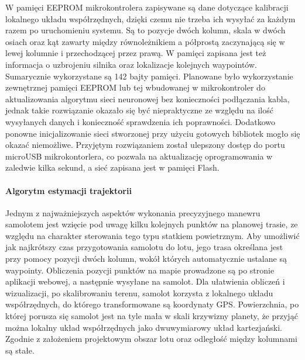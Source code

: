 \documentclass[12pt, a4paper]{article}
\begin{document}
W pamięci EEPROM mikrokontrolera zapisywane są dane dotyczące kalibracji lokalnego  układu współrzędnych, dzięki czemu nie trzeba ich wysyłać za każdym razem po uruchomieniu systemu. Są to pozycje dwóch kolumn, skala w dwóch osiach oraz kąt zawarty między równoleżnikiem a półprostą zaczynającą się w lewej kolumnie i przechodzącej przez prawą. W pamięci zapisana jest też informacja o uzbrojeniu silnika oraz lokalizacje kolejnych waypointów. Sumarycznie wykorzystane są 142 bajty pamięci. Planowane było wykorzystanie zewnętrznej pamięci EEPROM lub tej wbudowanej w mikrokontroler do aktualizowania algorytmu sieci neuronowej bez konieczności podłączania kabla, jednak takie rozwiązanie okazało się być niepraktyczne ze względu na ilość wysyłanych danych i konieczność sprawdzenia ich poprawności. Dodatkowo ponowne inicjalizowanie sieci stworzonej przy użyciu gotowych bibliotek mogło się okazać niemożliwe. Przyjętym rozwiązaniem został ulepszony dostęp do portu microUSB mikrokontorlera, co pozwala na aktualizację oprogramowania w zaledwie kilka sekund, a sieć zapisana jest w pamięci Flash.

\FloatBarrier
\paragraph{Algorytm estymacji trajektorii}\mbox{}

Jednym z najważniejszych aspektów wykonania precyzyjnego manewru samolotem jest wzięcie pod uwagę kilku kolejnych punktów na planowej trasie, ze względu na charakter sterowania tego typu statkiem powietrznym. Aby umożliwić jak najkrótszy czas przygotowania samolotu do lotu, jego trasa określana jest przy pomocy pozycji dwóch kolumn, wokół których automatycznie ustalane są waypointy. Obliczenia pozycji punktów na mapie prowadzone są po stronie aplikacji webowej, a następnie wysyłane na samolot. Dla ułatwienia obliczeń i wizualizacji, po skalibrowaniu terenu, samolot korzysta z lokalnego układu współrzędnych, do którego transformowane są koordynaty GPS. Powierzchnia, po której porusza się samolot jest na tyle mała w skali krzywizny planety, że przyjąć można lokalny układ współrzędnych jako dwuwymiarowy układ kartezjański. Zgodnie z założeniem projektowym obszar lotu oraz odległość między kolumnami są stałe.
\end{document}
